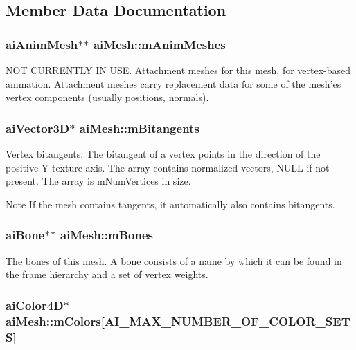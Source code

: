 \subsection{Member Data Documentation}
\hypertarget{structai_mesh_a5078f7db7e99ed05db89dfa412f0e990}{
\subsubsection[{m\-Anim\-Meshes}]{ {\bf ai\-Anim\-Mesh}$\ast$$\ast$ ai\-Mesh\-::m\-Anim\-Meshes}}\label{structai_mesh_a5078f7db7e99ed05db89dfa412f0e990}
N\-O\-T C\-U\-R\-R\-E\-N\-T\-L\-Y I\-N U\-S\-E. Attachment meshes for this mesh, for vertex-\/based animation. Attachment meshes carry replacement data for some of the mesh'es vertex components (usually positions, normals). \hypertarget{structai_mesh_ab2a81bfe1731f01271ebab274a8f01c4}{
\subsubsection[{m\-Bitangents}]{ {\bf ai\-Vector3\-D}$\ast$ ai\-Mesh\-::m\-Bitangents}}\label{structai_mesh_ab2a81bfe1731f01271ebab274a8f01c4}
Vertex bitangents. The bitangent of a vertex points in the direction of the positive Y texture axis. The array contains normalized vectors, N\-U\-L\-L if not present. The array is m\-Num\-Vertices in size. \begin{DoxyNote}{Note}
If the mesh contains tangents, it automatically also contains bitangents. 
\end{DoxyNote}
\hypertarget{structai_mesh_a0c0582a7f45b340b6a33552c53232539}{
\subsubsection[{m\-Bones}]{ {\bf ai\-Bone}$\ast$$\ast$ ai\-Mesh\-::m\-Bones}}\label{structai_mesh_a0c0582a7f45b340b6a33552c53232539}
The bones of this mesh. A bone consists of a name by which it can be found in the frame hierarchy and a set of vertex weights. \hypertarget{structai_mesh_ad9215f67bd0c2277b10775a8adb66b96}{
\subsubsection[{m\-Colors}]{ {\bf ai\-Color4\-D}$\ast$ ai\-Mesh\-::m\-Colors\mbox{[}{\bf A\-I\-\_\-\-M\-A\-X\-\_\-\-N\-U\-M\-B\-E\-R\-\_\-\-O\-F\-\_\-\-C\-O\-L\-O\-R\-\_\-\-S\-E\-T\-S}\mbox{]}}}\label{structai_mesh_ad9215f67bd0c2277b10775a8adb66b96}
